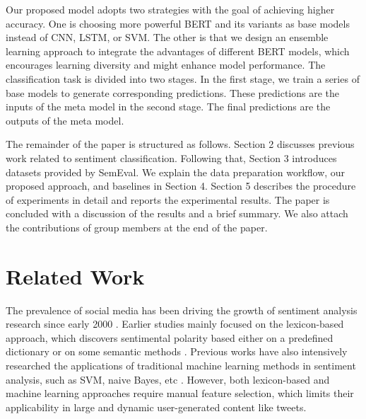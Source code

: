 \documentclass[runningheads]{llncs}
\begin{document}
Our proposed model adopts two strategies with the goal of achieving higher accuracy. One is choosing more powerful BERT and its variants as base models instead of CNN, LSTM, or SVM. The other is that we design an ensemble learning approach to integrate the advantages of different BERT models, which encourages learning diversity and might enhance model performance. The classification task is divided into two stages. In the first stage, we train a series of base models to generate corresponding predictions. These predictions are the inputs of the meta model in the second stage. The final predictions are the outputs of the meta model.

The remainder of the paper is structured as follows. Section 2 discusses previous work related to sentiment classification. Following that, Section 3 introduces datasets provided by SemEval. We explain the data preparation workflow, our proposed approach, and baselines in Section 4. Section 5 describes the procedure of experiments in detail and reports the experimental results. The paper is concluded with a discussion of the results and a brief summary. We also attach the contributions of group members at the end of the paper. 

\section{Related Work}
The prevalence of social media has been driving the growth of sentiment analysis research since early 2000 \cite{2018sa}. Earlier studies mainly focused on the lexicon-based approach, which discovers sentimental polarity based either on a predefined dictionary or on some semantic methods \cite{2014sa}. Previous works have also intensively researched the applications of traditional machine learning methods in sentiment analysis, such as SVM, naive Bayes, etc \cite{2019sa}. However, both lexicon-based and machine learning approaches require manual feature selection, which limits their applicability in large and dynamic user-generated content like tweets.
\end{document}
